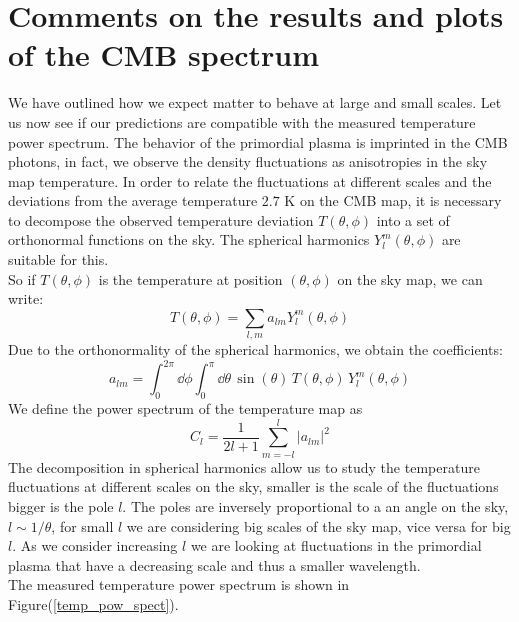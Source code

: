 \documentclass{article}
\begin{document}
\section{Comments on the results and plots of the CMB spectrum}
We have outlined how we expect matter to behave at large and small scales.
Let us now see if our predictions are compatible with the measured temperature power spectrum.
The behavior of the primordial plasma is imprinted in the CMB photons, in fact, we observe the density fluctuations as anisotropies in the sky map temperature.
In order to relate the fluctuations at different scales and the deviations from the average temperature $2.7$ K on the CMB map, it is necessary to decompose the observed temperature deviation $T(\theta, \phi)$ into a set of orthonormal functions on the sky.
The spherical harmonics $Y^{m} _{l} (\theta, \phi)$ are suitable for this.\\
So if $T(\theta,\phi)$ is the temperature at position $(\theta,\phi)$ on the sky map,
we can write:
\begin{equation}
T(\theta, \phi) = \sum _{l, m} a_{lm} Y^{m} _l (\theta, \phi)
\end{equation}
Due to the orthonormality of the spherical harmonics, we obtain the coefficients:
\begin{equation}
a_{lm} = \int _0 ^{2 \pi} \dd \phi \int _0  ^{\pi} \dd \theta \,
\sin( \theta) \, T(\theta, \phi) \, Y^{m} _l (\theta, \phi)
 \end{equation} 
We define the power spectrum of the temperature map as 
 \begin{equation}
 C_l = \dfrac{1}{2l+1} \sum _{m=-l} ^{l} |a_{lm}|^2
 \end{equation}
The decomposition in spherical harmonics allow us to study the temperature fluctuations at different scales on the sky, smaller is the scale of the fluctuations bigger is the pole $l$.
The poles are inversely proportional to a an angle on the sky, $l \sim 1/ \theta$, for small $l$ we are considering big scales of the sky map, vice versa for big $l$.
As we consider increasing $l$ we are looking at fluctuations in the primordial plasma that have a decreasing  scale and thus a smaller wavelength.\\
The measured temperature power spectrum is shown in Figure(\ref{temp_pow_spect}).
%
%
%
\end{document}
